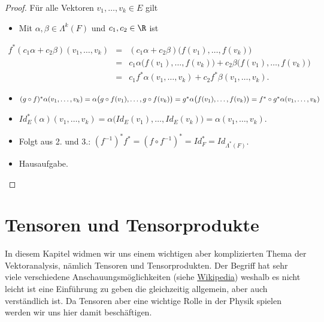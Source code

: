 \begin{proof}
 Für alle Vektoren \(v_1,\ldots,v_k\in E\) gilt
\begin{itemize}
\item {} 
\par
Mit \(\alpha, \beta\in\Lambda^k(F)\) und \(c_1,c_2\in\R\) ist

\end{itemize}
\begin{align*}
f^*(c_1\alpha+c_2\beta)(v_1,\ldots,v_k)
 &=& (c_1\alpha+c_2\beta) \big(f(v_1),\ldots,f(v_k)\big)\\
&=& c_1\alpha\big(f(v_1),\ldots,f(v_k)\big) + c_2\beta\big(f(v_1),\ldots,f(v_k)\big)\\
&=& c_1f^*\alpha(v_1,\ldots,v_k)+c_2f^*\beta(v_1,\ldots,v_k).
\end{align*}\begin{itemize}
\item {} 
\par
\((g\circ f)^*\alpha( v_1,\ldots, v_k) = \alpha\big(g\circ f( v_1),\ldots, g\circ f( v_k)\big)= g^*\alpha\big(f( v_1),\ldots,f( v_k)\big)\\=  f^*\circ g^*\alpha( v_1,\ldots, v_k)\)

\item {} 
\par
\(Id_E^*(\alpha)(v_1,\ldots,v_k) = \alpha\big(Id_E(v_1),\ldots,Id_E(v_k)\big)
= \alpha(v_1,\ldots,v_k)\).

\item {} 
\par
Folgt aus 2. und 3.: \((f^{-1})^*f^* = (f\circ f^{-1})^* = Id_F^* =
Id_{\Lambda^*(F)}\).

\item {} 
\par
Hausaufgabe.

\end{itemize}
\end{proof}


\section{Tensoren und Tensorprodukte}
\label{\detokenize{vektoranalysis/tensor:tensoren-und-tensorprodukte}}\label{\detokenize{vektoranalysis/tensor::doc}}
\par
In diesem Kapitel widmen wir uns einem wichtigen aber komplizierten Thema der Vektoranalysis, nämlich Tensoren und Tensorprodukten.
Der Begriff hat sehr viele verschiedene Anschauungsmöglichkeiten (siehe \href{https://de.wikipedia.org/wiki/Tensorprodukt}{Wikipedia}) weshalb es nicht leicht ist eine Einführung zu geben die gleichzeitig allgemein, aber auch verständlich ist. Da Tensoren aber eine wichtige Rolle in der Physik spielen werden wir uns hier damit beschäftigen.



